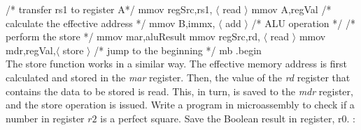 \begin{ExerciseList}
/* transfer rs1 to register A*/\newline
mmov regSrc,rs1, $\langle$ read $\rangle$ \newline
mmov A,regVal\newline
\newline
/* calculate the effective address */\newline
mmov B,immx, $\langle$ add $\rangle$ /* ALU operation */\newline
\newline
/* perform the store */\newline
mmov mar,aluResult\newline
mmov regSrc,rd, $\langle$ read $\rangle$\newline
mmov mdr,regVal,$\langle$ store $\rangle$\newline
\newline
/* jump to the beginning */\newline
mb .begin \newline \\
The store function works in a similar way. The effective memory address is first calculated and stored in the \textit{mar} register. Then, the value of the \textit{rd} register that contains the data to be stored is read. This, in turn, is saved to the \textit{mdr} register, and the store operation is issued.
\Exercise
Write a program in microassembly to check if a number in register $r2$ is a perfect square. Save the Boolean result
in register, r0.
\Answer :


\end{ExerciseList}
